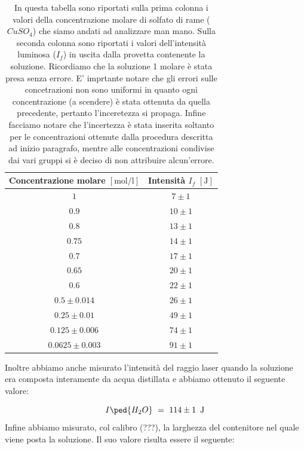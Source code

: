 \begin{table}[t!]
    \centering
    \begin{tabular}{c c }
        \toprule
         Concentrazione molare $[\si{\mole\per\litre}]$ & Intensità $I_f \,\, [\si{\joule}]$ \\
        \midrule
		$1$ 	& $7 \pm 1$ \\
		$0.9$ 	& $10 \pm 1$ \\       
        $0.8$ 	& $13 \pm 1$ \\
        $0.75$ 	& $14 \pm 1$ \\
        $0.7$ 	& $17 \pm 1$ \\
        $0.65$ 	& $20 \pm 1$ \\
        $0.6$ 	& $22 \pm 1$ \\
        $0.5 \pm 0.014$ 	& $26 \pm 1$ \\
        $0.25 \pm 0.01$ 	& $49 \pm 1$ \\
        $0.125 \pm 0.006$ & $74 \pm 1$ \\
        $0.0625 \pm 0.003$ & $91 \pm 1$ \\
        \bottomrule
    \end{tabular}
    \caption{In questa tabella sono riportati sulla prima colonna i valori della concentrazione molare di solfato di rame ($CuSO_4$) che siamo andati ad analizzare man mano. Sulla seconda colonna sono riportati i valori dell'intensità luminosa ($I_f$) in uscita dalla provetta contenente la soluzione. Ricordiamo che la soluzione 1 molare è stata presa senza errore. E' imprtante notare che gli errori sulle concetrazioni non sono uniformi in quanto ogni concentrazione (a scendere) è stata ottenuta da quella precedente, pertanto l'inceretezza si propaga. Infine facciamo notare che l'incertezza è stata inserita soltanto per le concentrazioni ottenute dalla procedura descritta ad inizio paragrafo, mentre alle concentrazioni condivise dai vari gruppi si è deciso di non attribuire alcun'errore.}
    \label{tab:dati}
\end{table}
%
Inoltre abbiamo anche misurato l'intensità del raggio laser quando la soluzione era composta interamente da acqua distillata e abbiamo ottenuto il seguente valore:

\begin{equation}
	I\ped{H_2O} \,\,=\,\, 114 \pm 1 \,\,\, \si{\joule}
	\label{eq:acqua}
\end{equation}
%
Infine abbiamo misurato, col calibro (???), la larghezza del contenitore nel quale viene posta la soluzione. Il suo valore risulta essere il seguente:


